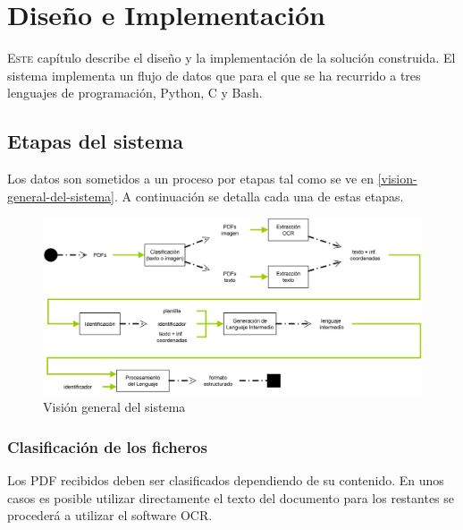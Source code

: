 
\chapter{Diseño e Implementación}
\label{chap:implemetación}

\lettrine{E}{ste} capítulo describe el diseño y la implementación de la solución construida. El sistema implementa un flujo de datos que para el que se ha recurrido a tres lenguajes de programación, Python, C y Bash.

\section{Etapas del sistema}

Los datos son sometidos a un proceso por etapas tal como se ve en \ref{vision-general-del-sistema}. A continuación se detalla cada una de estas etapas.

\begin{figure}[hp!]
    \centering
    \includegraphics[width=1.0\textwidth]{imaxes/h-implementacion/vision-general-del-sistema-2}
    \caption{Visión general del sistema}
    \label{fig:vision-general-del-sistema}
\end{figure}


\subsection{Clasificación de los ficheros}

Los PDF recibidos deben ser clasificados dependiendo de su contenido. En unos casos es posible utilizar directamente el texto del documento para los restantes se procederá a utilizar el software OCR.

